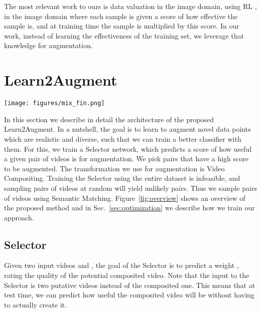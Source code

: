 \documentclass[runningheads]{llncs}
\newcommand{\Method}{Learn2Augment\xspace}
\newcommand{\SemanticMatch}{Semantic Matching\xspace}
\newcommand{\VideoMix}{Video Compositing\xspace}
\begin{document}
The most relevant work to ours is data valuation in the image domain, using RL \cite{yoon2020data}, in the image domain where each sample is given a score of how effective the sample is, and at training time the sample is multiplied by this score. In our work, instead of learning the effectiveness of the training set, we leverage that knowledge for augmentation. 


\section{\Method}

\begin{figure*}[t]
\centering
    \texttt{[image: figures/mix\_fin.png]}
    \caption{Pipeline for compositing a single frame. The foreground is from the class ``soccer juggling'' and the background from the class ``soccer penalty'', which are semantic class neighbors. We can see objects such as `person' and `ball' are detected as objects of interest.}
    \label{fig:mix}
\end{figure*}



In this section we describe in detail the architecture of the proposed \Method. In a nutshell, the goal is to learn to augment novel data points which are realistic and diverse, such that we can train a better classifier with them. For this, we train a Selector network, which predicts a score of how useful a given pair of videos is for augmentation. We pick pairs that have a high score to be augmented. The transformation we use for augmentation is \VideoMix. Training the Selector using the entire dataset is infeasible, and sampling pairs of videos at random will yield unlikely pairs. Thus we sample pairs of videos using \SemanticMatch. Figure~\ref{fig:overview} shows an overview of the proposed method and in Sec.~\ref{sec:optimization} we describe how we train our approach.







\subsection{Selector}
\label{subsec:choosing} 




Given two input videos  and , the goal of the Selector is to predict a weight , rating the quality of the potential composited video. Note that the input to the Selector is two putative videos instead of the composited one. This means that at test time, we can predict how useful the composited video will be without having to actually create it. 
\end{document}
